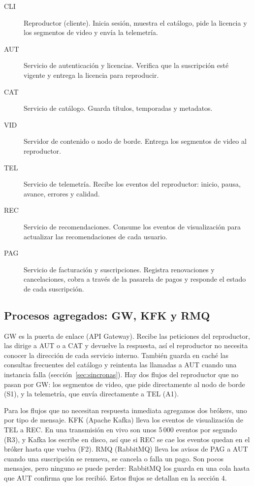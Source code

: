 \begin{description}
  \item[CLI] Reproductor (cliente). Inicia sesión, muestra el catálogo,
    pide la licencia y los segmentos de video y envía la telemetría.
  \item[AUT] Servicio de autenticación y licencias. Verifica que la
    suscripción esté vigente y entrega la licencia para reproducir.
  \item[CAT] Servicio de catálogo. Guarda títulos, temporadas y
    metadatos.
  \item[VID] Servidor de contenido o nodo de borde. Entrega los
    segmentos de video al reproductor.
  \item[TEL] Servicio de telemetría. Recibe los eventos del
    reproductor: inicio, pausa, avance, errores y calidad.
  \item[REC] Servicio de recomendaciones. Consume los eventos de
    visualización para actualizar las recomendaciones de cada usuario.
  \item[PAG] Servicio de facturación y suscripciones. Registra
    renovaciones y cancelaciones, cobra a través de la pasarela de
    pagos y responde el estado de cada suscripción.
\end{description}

\subsection{Procesos agregados: GW, KFK y RMQ}

GW es la puerta de enlace (API Gateway). Recibe las peticiones del
reproductor, las dirige a AUT o a CAT y devuelve la respuesta, así el
reproductor no necesita conocer la dirección de cada servicio interno.
También guarda en caché las consultas frecuentes del catálogo y
reintenta las llamadas a AUT cuando una instancia falla
(sección~\ref{sec:sincronas}). Hay dos flujos del reproductor que no
pasan por GW: los segmentos de video, que pide directamente al nodo de
borde (S1), y la telemetría, que envía directamente a TEL (A1).

Para los flujos que no necesitan respuesta inmediata agregamos dos
brókers, uno por tipo de mensaje. KFK (Apache Kafka) lleva los eventos
de visualización de TEL a REC. En una transmisión en vivo son unos
5\,000 eventos por segundo (R3), y Kafka los escribe en disco, así que
si REC se cae los eventos quedan en el bróker hasta que vuelva (F2).
RMQ (RabbitMQ) lleva los avisos de PAG a AUT cuando una suscripción se
renueva, se cancela o falla un pago. Son pocos mensajes, pero ninguno
se puede perder: RabbitMQ los guarda en una cola hasta que AUT confirma
que los recibió. Estos flujos se detallan en la sección 4.

